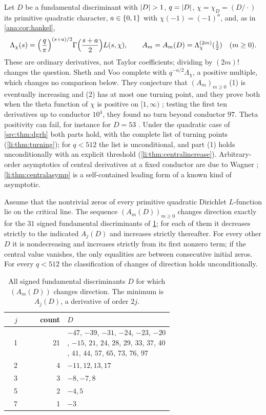 Let $D$ be a fundamental discriminant with $\lvert D\rvert>1$, $q=\lvert D\rvert$, $\chi=\chi_D=(D/\cdot)$ its primitive
quadratic character, $a\in\{0,1\}$ with $\chi(-1)=(-1)^a$, and, as in \cref{ana:cor:hankel},
\[
 \Lambda_\chi(s)=\Bigl(\frac q\pi\Bigr)^{(s+a)/2}\Gamma\Bigl(\frac{s+a}2\Bigr)L(s,\chi),\qquad
 A_m=A_m(D)=\Lambda_\chi^{(2m)}(\tfrac12)\quad(m\ge0).
\]
These are ordinary derivatives, not Taylor coefficients; dividing by $(2m)!$ changes the question.
Sheth and Voo complete with $q^{-a/2}\Lambda_\chi$, a positive multiple, which changes no comparison
below. They conjecture \cite[Conjecture~1.5]{ShethVoo2026Super} that $(A_m)_{m\ge0}$ (1) is
eventually increasing and (2) has at most one turning point, and they prove both when the theta
function of $\chi$ is positive on $[1,\infty)$ \cite[Theorem~1.6]{ShethVoo2026Super}; testing the first
ten derivatives up to conductor $10^4$, they found no turn beyond conductor $97$. Theta positivity can
fail, for instance for $D=53$ \cite{LouboutinMunsch2013Positive}. Under the quadratic case of
\cref{src:thm:dgrh} both parts hold, with the complete list of turning points
(\cref{li:thm:turning}); for $q<512$ the list is unconditional, and part (1) holds unconditionally
with an explicit threshold (\cref{li:thm:centralincrease}). Arbitrary-order asymptotics of central
derivatives at a fixed conductor are due to Wagner \cite[Theorem~2.1, Corollary~1.4]{Wagner2020Jensen};
\cref{li:thm:centralasymp} is a self-contained leading form of a known kind of asymptotic.

\begin{theorem}\label{li:thm:turning}
Assume that the nontrivial zeros of every primitive quadratic Dirichlet $L$-function lie on the
critical line. The sequence $(A_m(D))_{m\ge0}$ changes direction exactly for the $31$ signed
fundamental discriminants of \cref{li:tab:turning}; for each of them it decreases strictly to the
indicated $A_j(D)$ and increases strictly thereafter. For every other $D$ it is nondecreasing and
increases strictly from its first nonzero term; if the central value vanishes, the only equalities
are between consecutive initial zeros. For every $q<512$ the classification of changes of direction
holds unconditionally.
\end{theorem}

\begin{table}[ht]
\centering\small
\caption{All signed fundamental discriminants $D$ for which $(A_m(D))$ changes direction. The minimum
is $A_j(D)$, a derivative of order $2j$.}\label{li:tab:turning}
\begin{tabular}{@{}rrp{0.64\linewidth}@{}}
\toprule
$j$ & count & $D$\\
\midrule
1 & 21 & $-47$, $-39$, $-31$, $-24$, $-23$, $-20$, $-15$, $21$, $24$, $28$, $29$, $33$, $37$, $40$, $41$, $44$, $57$, $65$, $73$, $76$, $97$\\
2 & 4 & $-11,12,13,17$\\
3 & 3 & $-8,-7,8$\\
5 & 2 & $-4,5$\\
7 & 1 & $-3$\\
\bottomrule
\end{tabular}
\end{table}

